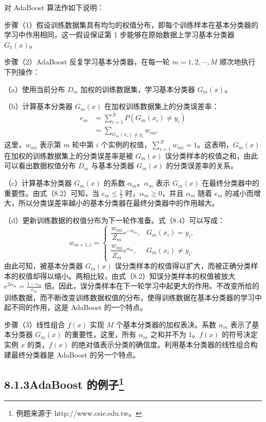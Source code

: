 \documentclass[UTF8, 12pt, fontset=fandol, oneside]{ctexart}
\begin{document}
对 AdaBoost 算法作如下说明：

步骤（1）\quad 假设训练数据集具有均匀的权值分布，即每个训练样本在基本分类器的学习中作用相同，这一假设保证第 1 步能够在原始数据上学习基本分类器 $G_1(x)$。

步骤（2）\quad AdaBoost 反复学习基本分类器，在每一轮 $m=1,2,\cdots,M$ 顺次地执行下列操作：

（a）使用当前分布 $D_m$ 加权的训练数据集，学习基本分类器 $G_m(x)$。

（b）计算基本分类器 $G_m(x)$ 在加权训练数据集上的分类误差率：
\begin{equation}
\begin{aligned}
e_m&=\sum_{i=1}^N P(G_m(x_i)\ne y_i)\\
&=\sum_{G_m(x_i)\ne y_i}w_{mi}.
\end{aligned}
\tag{8.8}
\end{equation}
这里，$w_{mi}$ 表示第 $m$ 轮中第 $i$ 个实例的权值，$\sum_{i=1}^Nw_{mi}=1$。这表明，$G_m(x)$ 在加权的训练数据集上的分类误差率是被 $G_m(x)$ 误分类样本的权值之和，由此可以看出数据权值分布 $D_m$ 与基本分类器 $G_m(x)$ 的分类误差率的关系。

（c）计算基本分类器 $G_m(x)$ 的系数 $\alpha_m$。$\alpha_m$ 表示 $G_m(x)$ 在最终分类器中的重要性。由式（8.2）可知，当 $e_m\leq \frac{1}{2}$ 时，$\alpha_m\geq 0$，并且 $\alpha_m$ 随着 $e_m$ 的减小而增大，所以分类误差率越小的基本分类器在最终分类器中的作用越大。

（d）更新训练数据的权值分布为下一轮作准备。式（8.4）可以写成：
\[
w_{m+1,i}=
\begin{cases}
\dfrac{w_{mi}}{Z_m}e^{-\alpha_m}, & G_m(x_i)=y_i,\\[0.4em]
\dfrac{w_{mi}}{Z_m}e^{\alpha_m}, & G_m(x_i)\ne y_i.
\end{cases}
\]
由此可知，被基本分类器 $G_m(x)$ 误分类样本的权值得以扩大，而被正确分类样本的权值却得以缩小。两相比较，由式（8.2）知误分类样本的权值被放大 $e^{2\alpha_m}=\frac{1-e_m}{e_m}$ 倍。因此，误分类样本在下一轮学习中起更大的作用。不改变所给的训练数据，而不断改变训练数据权值的分布，使得训练数据在基本分类器的学习中起不同的作用，这是 AdaBoost 的一个特点。

步骤（3）\quad 线性组合 $f(x)$ 实现 $M$ 个基本分类器的加权表决。系数 $\alpha_m$ 表示了基本分类器 $G_m(x)$ 的重要性，这里，所有 $\alpha_m$ 之和并不为 1。$f(x)$ 的符号决定实例 $x$ 的类，$f(x)$ 的绝对值表示分类的确信度。利用基本分类器的线性组合构建最终分类器是 AdaBoost 的另一个特点。

\subsection*{8.1.3\quad AdaBoost 的例子\protect\footnote{例题来源于 http://www.csie.edu.tw。}}
\end{document}
